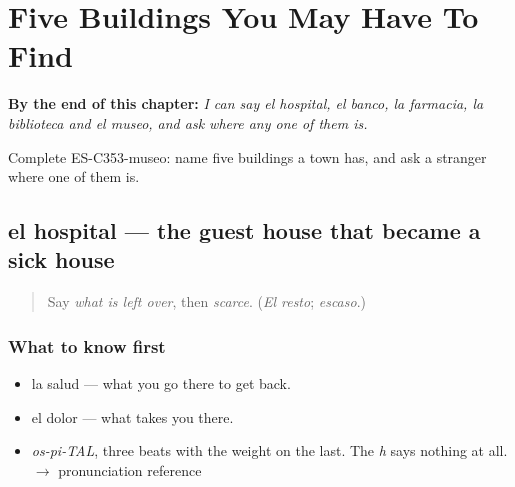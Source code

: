 
\chapter{Five Buildings You May Have To Find}
\label{ch:el-hospital-y-el-banco}

\begin{chapteropening}
\textbf{By the end of this chapter:} \emph{I can say el hospital, el banco, la farmacia, la biblioteca and el museo, and ask where any one of them is.}

Complete ES-C353-museo: name five buildings a town has, and ask a stranger where one of them is.
\end{chapteropening}

\section[el hospital]{el hospital — the guest house that became a sick house}

\label{lesson:ES-C353-hospital}



\begin{quote}
Say \emph{what is left over}, then \emph{scarce}. (\emph{El resto}; \emph{escaso}.)
\end{quote}

\subsection*{What to know first}
\begin{itemize}
\raggedright
  \item la salud — what you go there to get back.
  \item el dolor — what takes you there.
\end{itemize}

\begin{sounds}
\begin{itemize}
\raggedright
  \item \emph{os-pi-TAL}, three beats with the weight on the last. The \emph{h} says nothing at all. $\to$ pronunciation reference
\end{itemize}
\end{sounds}

